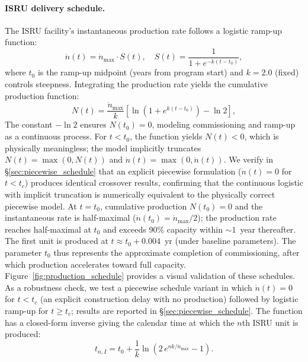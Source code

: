 \documentclass[preprint,12pt]{elsarticle}
\begin{document}
\paragraph{ISRU delivery schedule.} The ISRU facility's instantaneous production rate follows a logistic ramp-up function:
\begin{equation}
  \dot{n}(t) = \dot{n}_{\max} \cdot S(t), \quad S(t) = \frac{1}{1 + e^{-k(t - t_0)}},
  \label{eq:scurve}
\end{equation}
where $t_0$ is the ramp-up midpoint (years from program start) and $k = 2.0$ (fixed) controls steepness. Integrating the production rate yields the cumulative production function:
\begin{equation}
  N(t) = \frac{\dot{n}_{\max}}{k} \left[ \ln\!\left(1 + e^{k(t - t_0)}\right) - \ln 2 \right],
  \label{eq:cumulative_production}
\end{equation}
The constant $-\ln 2$ ensures $N(t_0) = 0$, modeling commissioning and ramp-up as a continuous process. For $t < t_0$, the function yields $N(t) < 0$, which is physically meaningless; the model implicitly truncates $N(t) = \max(0, N(t))$ and $\dot{n}(t) = \max(0, \dot{n}(t))$. We verify in \S\ref{sec:piecewise_schedule} that an explicit piecewise formulation ($\dot{n}(t) = 0$ for $t < t_c$) produces identical crossover results, confirming that the continuous logistic with implicit truncation is numerically equivalent to the physically correct piecewise model. At $t = t_0$, cumulative production $N(t_0) = 0$ and the instantaneous rate is half-maximal ($\dot{n}(t_0) = \dot{n}_{\max}/2$); the production rate reaches half-maximal at $t_0$ and exceeds 90\% capacity within ${\sim}1$~year thereafter. The first unit is produced at $t \approx t_0 + 0.004$~yr (under baseline parameters). The parameter $t_0$ thus represents the approximate completion of commissioning, after which production accelerates toward full capacity. Figure~\ref{fig:production_schedule} provides a visual validation of these schedules. As a robustness check, we test a piecewise schedule variant in which $\dot{n}(t) = 0$ for $t < t_c$ (an explicit construction delay with no production) followed by logistic ramp-up for $t \geq t_c$; results are reported in \S\ref{sec:piecewise_schedule}. The function has a closed-form inverse giving the calendar time at which the $n$th ISRU unit is produced:
\begin{equation}
  t_{n,I} = t_0 + \frac{1}{k} \ln\!\left(2\,e^{nk/\dot{n}_{\max}} - 1\right).
  \label{eq:production_schedule}
\end{equation}
\end{document}
